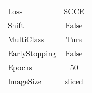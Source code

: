 
\pagestyle{empty}

\begin{tabular}{|l||c|} 
 \hline
 Loss & SCCE \\
 Shift & False \\
 MultiClass & Ture \\
 EarlyStopping & False \\
 Epochs & 50 \\
 ImageSize & sliced \\
 \hline
\end{tabular}

